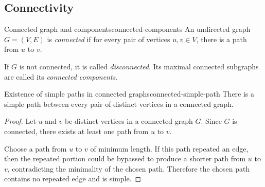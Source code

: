 \subsection{Connectivity}

\begin{definition}{Connected graph and components}{connected-components}
An undirected graph \(G=(V,E)\) is \emph{connected} if for every pair of vertices \(u,v\in V\), there is a path from \(u\) to \(v\).

If \(G\) is not connected, it is called \emph{disconnected}. Its maximal connected subgraphs are called its \emph{connected components}.
\end{definition}

\begin{center}
\end{center}

\begin{theorem}{Existence of simple paths in connected graphs}{connected-simple-path}
There is a simple path between every pair of distinct vertices in a connected graph.
\end{theorem}

\begin{proof}
Let \(u\) and \(v\) be distinct vertices in a connected graph \(G\). Since \(G\) is connected, there exists at least one path from \(u\) to \(v\).

Choose a path from \(u\) to \(v\) of minimum length. If this path repeated an edge, then the repeated portion could be bypassed to produce a shorter path from \(u\) to \(v\), contradicting the minimality of the chosen path. Therefore the chosen path contains no repeated edge and is simple.
\end{proof}


